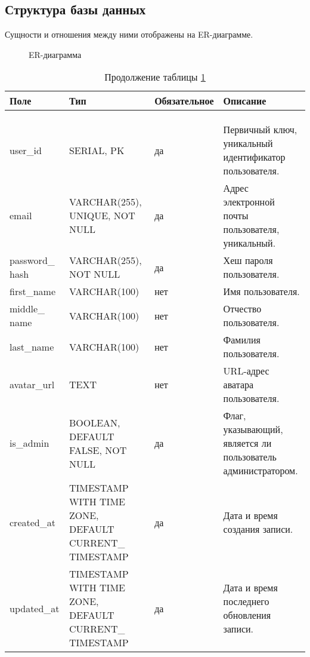 \subsection{Структура базы данных}
Сущности и отношения между ними отображены на ER-диаграмме.
\newpage
 \begin{figure}[ht]
	\caption{ER-диаграмма}
	\label{er_diagram:image}
\end{figure}
\newpage
\begin{xltabular}{\textwidth}{|p{2.5cm}|p{4cm}|p{1.7cm}|X|}
	\caption{Атрибуты сущности «Users»\label{users:table}}\\ \hline
	\centrow Поле & \centrow Тип & \centrow Обяза\-тельное & \centrow Описание \\ \hline
	 &  &  &  \\ \hline
	\endfirsthead
	\caption*{Продолжение таблицы \ref{users:table}} \\ \hline
	 &  &  &  \\ \hline
	\finishhead
	user\_id & SERIAL, PK & \centrow да & Первичный ключ, уникальный идентификатор пользователя. \\ \hline
	email & VARCHAR(255), UNIQUE, NOT NULL & \centrow да & Адрес электронной почты пользователя, уникальный. \\ \hline
	password\_ hash & VARCHAR(255), NOT NULL & \centrow да & Хеш пароля пользователя. \\ \hline
	first\_name & VARCHAR(100) & \centrow нет & Имя пользователя. \\ \hline
	middle\_ name & VARCHAR(100) & \centrow нет & Отчество пользователя. \\ \hline
	last\_name & VARCHAR(100) & \centrow нет & Фамилия пользователя. \\ \hline
	avatar\_url & TEXT & \centrow нет & URL-адрес аватара пользователя. \\ \hline
	is\_admin & BOOLEAN, DEFAULT FALSE, NOT NULL & \centrow да & Флаг, указывающий, является ли пользователь администратором. \\ \hline
	created\_at & TIMESTAMP WITH TIME ZONE, DEFAULT CURRENT\_ TIMESTAMP & \centrow да & Дата и время создания записи. \\ \hline
	updated\_at & TIMESTAMP WITH TIME ZONE, DEFAULT CURRENT\_ TIMESTAMP & \centrow да & Дата и время последнего обновления записи. \\ \hline
\end{xltabular}


